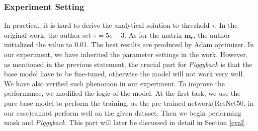 \subsubsection{Experiment Setting}
In practical, it is hard to derive the analytical solution to threshold $\tau$. In the original work, the author set $\tau=5e-3$. As for the matrix $\mathbf{m_r}$, the author initialized the value to 0.01. The best results are produced by Adam optimizer. In our experiment, we have inherited the parameter settings in the work. However, as mentioned in the previous statement, the crucial part for \textit{Piggyback} is that the base model have to be fine-tuned, otherwise the model will not work very well. We have also verified such phenomon in our experiment. To improve the performance, we modified the logic of the model. At the first task, we use the pure base model to perform the training, as the pre-trained network(ResNet50\cite{he2016deep}, in our case)cannot perform well on the given dataset. Then we begin performing mask and \textit{Piggyback}. This part will later be discussed in detail in Section \ref{eval}.





